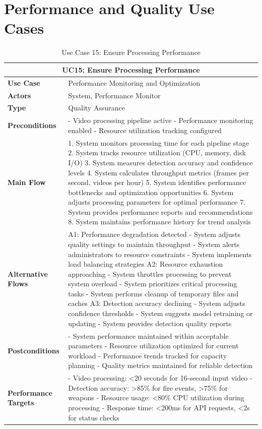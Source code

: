 \documentclass{article}
\begin{document}
\section{Performance and Quality Use Cases}

\begin{table}[H]
\centering
\begin{tabularx}{\textwidth}{|l|X|}
\hline
\multicolumn{2}{|c|}{\textbf{UC15: Ensure Processing Performance}} \\ \hline
\textbf{Use Case} & Performance Monitoring and Optimization \\ \hline
\textbf{Actors} & System, Performance Monitor \\ \hline
\textbf{Type} & Quality Assurance \\ \hline
\textbf{Preconditions} & 
- Video processing pipeline active
- Performance monitoring enabled
- Resource utilization tracking configured \\ \hline
\textbf{Main Flow} & 
1. System monitors processing time for each pipeline stage
2. System tracks resource utilization (CPU, memory, disk I/O)
3. System measures detection accuracy and confidence levels
4. System calculates throughput metrics (frames per second, videos per hour)
5. System identifies performance bottlenecks and optimization opportunities
6. System adjusts processing parameters for optimal performance
7. System provides performance reports and recommendations
8. System maintains performance history for trend analysis \\ \hline
\textbf{Alternative Flows} & 
A1: Performance degradation detected
- System adjusts quality settings to maintain throughput
- System alerts administrators to resource constraints
- System implements load balancing strategies
A2: Resource exhaustion approaching
- System throttles processing to prevent system overload
- System prioritizes critical processing tasks
- System performs cleanup of temporary files and caches
A3: Detection accuracy declining
- System adjusts confidence thresholds
- System suggests model retraining or updating
- System provides detection quality reports \\ \hline
\textbf{Postconditions} & 
- System performance maintained within acceptable parameters
- Resource utilization optimized for current workload
- Performance trends tracked for capacity planning
- Quality metrics maintained for reliable detection \\ \hline
\textbf{Performance Targets} & 
- Video processing: <20 seconds for 16-second input video
- Detection accuracy: >85\% for fire events, >75\% for weapons
- Resource usage: <80\% CPU utilization during processing
- Response time: <200ms for API requests, <2s for status checks \\ \hline
\end{tabularx}
\caption{Use Case 15: Ensure Processing Performance}
\end{table}
\end{document}
